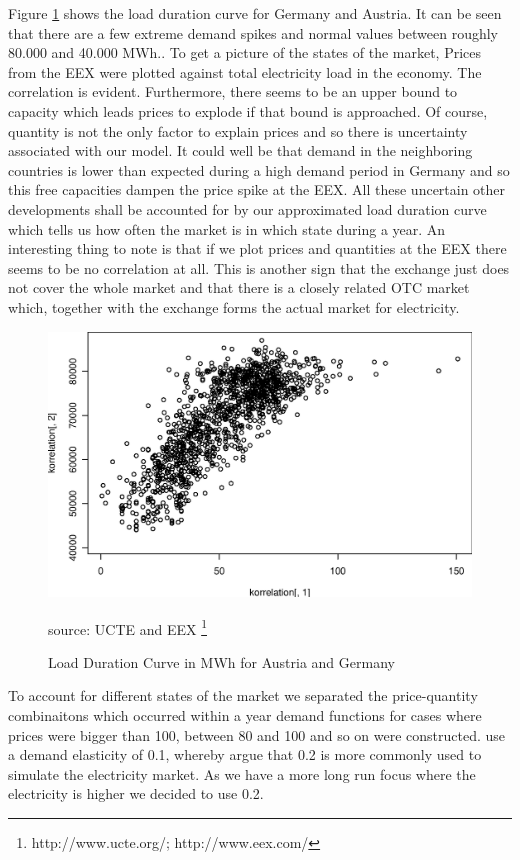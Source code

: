 Figure \ref{fig:ldc} shows the load duration curve for Germany and Austria. It can be seen that there are a few extreme demand spikes and normal values between roughly 80.000 and 40.000 MWh.. To get a picture of the states of the market, Prices from the EEX were plotted against total electricity load in the economy. The correlation is evident. Furthermore, there seems to be an upper bound to capacity which leads prices to explode if that bound is approached. Of course, quantity is not the only factor to explain prices and so there is uncertainty associated with our model. It could well be that demand in the neighboring countries is lower than expected during a high demand period in Germany and so this free capacities dampen the price spike at the EEX. All these uncertain other developments shall be accounted for by our approximated load duration curve which tells us how often the market is in which state during a year. An interesting thing to note is that if we plot prices and quantities at the EEX there seems to be no correlation at all. This is another sign that the exchange just does not cover the whole market and that there is a closely related OTC market which, together with the exchange forms the actual market for electricity.

\begin{figure}[h]
\centering
\includegraphics[width=.5\textwidth]{data/korrelation}
      \label{fig:ldc}
      \caption{Load Duration Curve in MWh for Austria and Germany}
      source: UCTE and EEX \footnote{http://www.ucte.org/; http://www.eex.com/}
\end{figure}

To account for different states of the market we separated the price-quantity combinaitons which occurred within a year demand functions for cases where prices were bigger than 100, between 80 and 100 and so on were constructed. \cite{Neuhoff2005} use a demand elasticity of 0.1, whereby \cite{Genc2007} argue that 0.2 is more commonly used to simulate the electricity market. As we have a more long run focus where the electricity is higher we decided to use 0.2.

